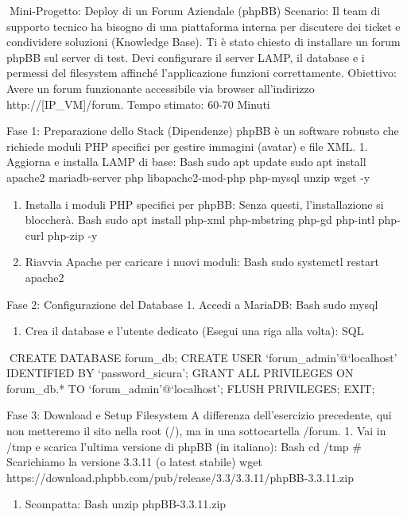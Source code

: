 \documentclass[11pt,a4paper]{article}
\providecommand{\tightlist}{%
  \setlength{\itemsep}{0pt}\setlength{\parskip}{0pt}}
\begin{document}
Mini-Progetto: Deploy di un Forum Aziendale (phpBB) Scenario: Il team di
supporto tecnico ha bisogno di una piattaforma interna per discutere dei
ticket e condividere soluzioni (Knowledge Base). Ti è stato chiesto di
installare un forum phpBB sul server di test. Devi configurare il server
LAMP, il database e i permessi del filesystem affinché l'applicazione
funzioni correttamente. Obiettivo: Avere un forum funzionante
accessibile via browser all'indirizzo http://{[}IP\_VM{]}/forum. Tempo
stimato: 60-70 Minuti

Fase 1: Preparazione dello Stack (Dipendenze) phpBB è un software
robusto che richiede moduli PHP specifici per gestire immagini (avatar)
e file XML. 1. Aggiorna e installa LAMP di base: Bash sudo apt update
sudo apt install apache2 mariadb-server php libapache2-mod-php php-mysql
unzip wget -y

\begin{enumerate}
\def\labelenumi{\arabic{enumi}.}
\setcounter{enumi}{1}
\item
  Installa i moduli PHP specifici per phpBB: Senza questi,
  l'installazione si bloccherà. Bash sudo apt install php-xml
  php-mbstring php-gd php-intl php-curl php-zip -y
\item
  Riavvia Apache per caricare i nuovi moduli: Bash sudo systemctl
  restart apache2
\end{enumerate}

Fase 2: Configurazione del Database 1. Accedi a MariaDB: Bash sudo mysql

\begin{enumerate}
\def\labelenumi{\arabic{enumi}.}
\setcounter{enumi}{1}
\tightlist
\item
  Crea il database e l'utente dedicato (Esegui una riga alla volta): SQL
\end{enumerate}

CREATE DATABASE forum\_db; CREATE USER `forum\_admin'@`localhost'
IDENTIFIED BY `password\_sicura'; GRANT ALL PRIVILEGES ON forum\_db.* TO
`forum\_admin'@`localhost'; FLUSH PRIVILEGES; EXIT;

Fase 3: Download e Setup Filesystem A differenza dell'esercizio
precedente, qui non metteremo il sito nella root (/), ma in una
sottocartella /forum. 1. Vai in /tmp e scarica l'ultima versione di
phpBB (in italiano): Bash cd /tmp \# Scarichiamo la versione 3.3.11 (o
latest stabile) wget
https://download.phpbb.com/pub/release/3.3/3.3.11/phpBB-3.3.11.zip

\begin{enumerate}
\def\labelenumi{\arabic{enumi}.}
\setcounter{enumi}{1}
\tightlist
\item
  Scompatta: Bash unzip phpBB-3.3.11.zip
\end{enumerate}
\end{document}
